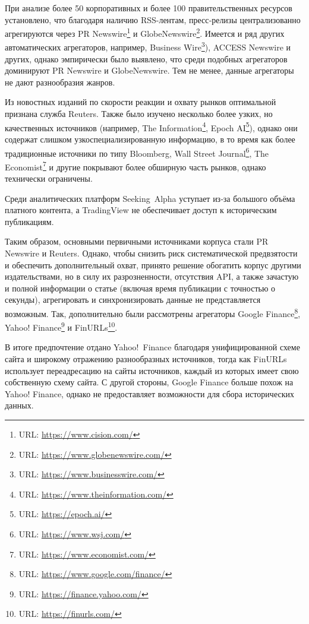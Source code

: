 При анализе более 50 корпоративных и более 100 правительственных ресурсов установлено,
что благодаря наличию RSS-лентам, пресс‑релизы централизованно агрегируются через PR Newswire\footnote{URL: \url{https://www.cision.com/}}
и GlobeNewswire\footnote{URL: \url{https://www.globenewswire.com/}}. Имеется и ряд других автоматических агрегаторов, например,
Business Wire\footnote{URL: \url{https://www.businesswire.com/}}),
ACCESS Newswire и других, однако эмпирически было выявлено, что среди подобных агрегаторов
доминируют PR Newswire и GlobeNewswire. Тем не менее, данные агрегаторы не дают разнообразия жанров.

Из новостных изданий по скорости реакции и охвату рынков оптимальной признана служба Reuters.
Также было изучено несколько более узких, но качественных источников (например, The Information\footnote{URL: \url{https://www.theinformation.com/}},
Epoch AI\footnote{URL: \url{https://epoch.ai/}}), однако они содержат слишком узкоспециализированную информацию, в то время как более
традиционные источники по типу Bloomberg, Wall Street Journal\footnote{URL: \url{https://www.wsj.com/}},
The Economist\footnote{URL: \url{https://www.economist.com/}} и другие покрывают более обширную часть рынков, однако технически ограничены.

Среди аналитических платформ Seeking Alpha уступает из‑за большого объёма платного контента,
а TradingView не обеспечивает доступ к историческим публикациям.

Таким образом, основными первичными источниками корпуса стали PR Newswire и Reuters. Однако, чтобы снизить риск
систематической предвзятости и обеспечить дополнительный охват, принято решение обогатить корпус другими
издательствами, но в силу их разрозненности, отсутствия API, а также зачастую и полной информации о статье
(включая время публикации с точностью о секунды), агрегировать и синхронизировать данные не представляется возможным.
Так, дополнительно были рассмотрены агрегаторы Google Finance\footnote{URL: \url{https://www.google.com/finance/}},
Yahoo! Finance\footnote{URL: \url{https://finance.yahoo.com/}} и FinURLs\footnote{URL: \url{https://finurls.com/}}.

В итоге предпочтение отдано Yahoo! Finance благодаря унифицированной схеме сайта и широкому отражению разнообразных
источников, тогда как FinURLs использует переадресацию на сайты источников, каждый из которых имеет свою собственную
схему сайта. С другой стороны, Google Finance больше похож на Yahoo! Finance, однако не предоставляет возможности
для сбора исторических данных.


